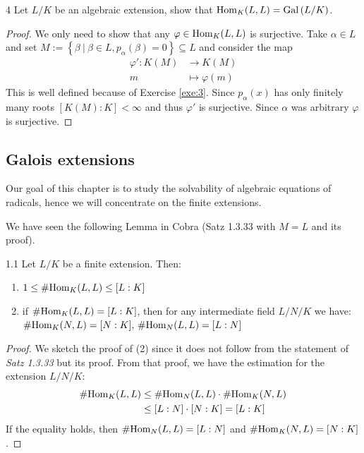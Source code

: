 \documentclass[twoside = false,	%
		headsepline,		%
		parskip = true,
		]{scrbook}						%
\begin{document}
        \begin{exercise}{}{4}
            Let $L/K$ be an algebraic extension, show that $\mathrm{Hom}_K(L,L) = \mathrm{Gal}\left( L/K\right)$.
        \end{exercise}
        \begin{proof}
            We only need to show that any $\varphi \in \mathrm{Hom}_K(L,L)$ is surjective. Take $\alpha \in L$ and set $M:= \left\{\beta \ | \ \beta \in L, p_\alpha(\beta) = 0 \right\} \subseteq L$ and consider the map
            \begin{align*}
                \varphi': K(M) &\rightarrow K(M) \\
                            m &\mapsto \varphi(m)
            \end{align*}
        This is well defined because of Exercise \ref{exe:3}. Since $p_\alpha(x)$ has only finitely many roots $[K(M):K] < \infty$ and thus $\varphi'$ is surjective. Since $\alpha$ was arbitrary $\varphi$ is surjective.
        \end{proof}
            
    \subsection{Galois extensions}
        Our goal of this chapter is to study the solvability of algebraic equations of radicals, hence we will concentrate on the finite extensions.
        
        We have seen the following Lemma in Cobra \cite{Cobra} (Satz 1.3.33 with $M=L$ and its proof).
        \begin{lemma}{}{1.1}
            Let $L/K$ be a finite extension. Then:
            \begin{enumerate}
                \item $1 \leq \# \mathrm{Hom}_K(L,L) \leq [L:K]$
                \item if $\#\mathrm{Hom}_K(L,L) = [L:K]$, then for any intermediate field $L/N/K$ we have:\\ $\#\mathrm{Hom}_K(N,L) = [N:K], \, \#\mathrm{Hom}_N(L,L) = [L:N]$
            \end{enumerate}
        \end{lemma}
        \begin{proof}
            We sketch the proof of (2) since it does not follow from the statement of \textit{Satz 1.3.33} but its proof. From that proof, we have the estimation for the extension $L/N/K$:
            \begin{align*}
                \#\mathrm{Hom}_K(L,L) &\leq \#\mathrm{Hom}_N(L,L) \cdot \# \mathrm{Hom}_K(N,L) \\
                &\leq [L:N] \cdot [N:K] = [L:K]
            \end{align*}
            If the equality holds, then $\#\mathrm{Hom}_N(L,L) = [L:N]$ and $\#\mathrm{Hom}_K(N,L) = [N:K]$.
        \end{proof}
        
\end{document}
